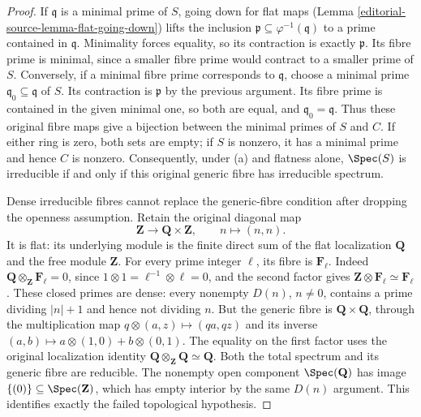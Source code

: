 \begin{proof}
If $\mathfrak q$ is a minimal
prime of $S$, going down for
flat maps (Lemma \ref{editorial-source-lemma-flat-going-down}) lifts the inclusion
$\mathfrak p\subseteq\varphi^{-1}(\mathfrak q)$
to a prime contained in
$\mathfrak q$. Minimality forces
equality, so its contraction is
exactly $\mathfrak p$. Its fibre
prime is minimal, since a smaller
fibre prime would contract to
a smaller prime of $S$.
Conversely, if a minimal fibre
prime corresponds to $\mathfrak q$,
choose a minimal prime
$\mathfrak q_0\subseteq\mathfrak q$
of $S$. Its contraction is
$\mathfrak p$ by the previous
argument. Its fibre prime is
contained in the given minimal
one, so both are equal, and
$\mathfrak q_0=\mathfrak q$.
Thus these original fibre maps
give a bijection between the
minimal primes of $S$ and $C$.
If either ring is zero, both
sets are empty; if $S$ is nonzero,
it has a minimal prime and hence
$C$ is nonzero. Consequently,
under (a) and flatness alone,
$\Spec(S)$ is irreducible if and
only if this original generic
fibre has irreducible spectrum.

Dense irreducible fibres cannot
replace the generic-fibre condition
after dropping the openness
assumption. Retain the original
diagonal map
$$
\mathbf Z\longrightarrow\mathbf Q\times\mathbf Z,
\qquad n\longmapsto(n,n).
$$
It is flat: its underlying module
is the finite direct sum of the
flat localization $\mathbf Q$
and the free module $\mathbf Z$.
For every prime integer $\ell$,
its fibre is $\mathbf F_\ell$.
Indeed $\mathbf Q\otimes_{\mathbf Z}\mathbf F_\ell=0$,
since $1\otimes1=\ell^{-1}\otimes\ell=0$,
and the second factor gives
$\mathbf Z\otimes\mathbf F_\ell\simeq\mathbf F_\ell$.
These closed primes are dense:
every nonempty $D(n)$, $n\neq0$,
contains a prime dividing $|n|+1$
and hence not dividing $n$.
But the generic fibre is
$\mathbf Q\times\mathbf Q$,
through the multiplication map
$q\otimes(a,z)\mapsto(qa,qz)$
and its inverse
$(a,b)\mapsto a\otimes(1,0)+b\otimes(0,1)$.
The equality on the first factor
uses the original localization
identity $\mathbf Q\otimes_{\mathbf Z}\mathbf Q\simeq\mathbf Q$.
Both the total spectrum and its
generic fibre are reducible.
The nonempty open component
$\Spec(\mathbf Q)$ has image
$\{(0)\}\subseteq\Spec(\mathbf Z)$,
which has empty interior by the
same $D(n)$ argument. This
identifies exactly the failed
topological hypothesis.
\end{proof}